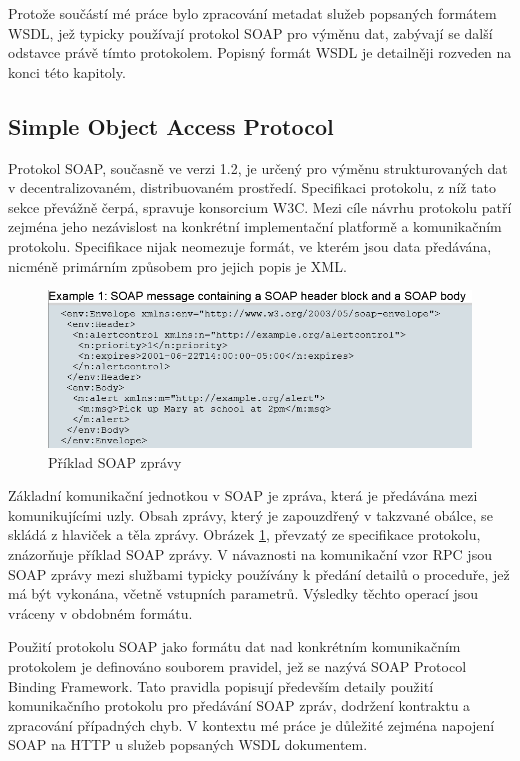 \documentclass[czech,DP]{thesiskiv}
\begin{document}
Protože součástí mé práce bylo zpracování metadat služeb popsaných formátem WSDL, jež typicky používají protokol SOAP pro výměnu dat, zabývají se další odstavce právě tímto protokolem. Popisný formát WSDL je detailněji rozveden na konci této kapitoly.

\subsection{Simple Object Access Protocol} 


Protokol SOAP, současně ve verzi 1.2, je určený pro výměnu strukturovaných dat v decentralizovaném, distribuovaném prostředí. Specifikaci protokolu\cite{soap12}, z níž tato sekce převážně čerpá, spravuje konsorcium W3C. Mezi cíle návrhu protokolu patří zejména jeho nezávislost na konkrétní implementační platformě a komunikačním protokolu\cite{soap12}. Specifikace nijak neomezuje formát, ve kterém jsou data předávána, nicméně primárním způsobem pro jejich popis je XML.

\begin{figure}[h]
	\centering
	\includegraphics[width=\linewidth]{soap-msg-example}
	\caption{Příklad SOAP zprávy}
	\label{fig:soap-msg-example}
\end{figure}

Základní komunikační jednotkou v SOAP je zpráva, která je předávána mezi komunikujícími uzly. Obsah zprávy, který je zapouzdřený v takzvané obálce, se skládá z hlaviček a těla zprávy. Obrázek \ref{fig:soap-msg-example}, převzatý ze specifikace protokolu, znázorňuje příklad SOAP zprávy. V návaznosti na komunikační vzor RPC jsou SOAP zprávy mezi službami typicky používány k předání detailů o proceduře, jež má být vykonána, včetně vstupních parametrů. Výsledky těchto operací jsou vráceny v obdobném formátu.

Použití protokolu SOAP jako formátu dat nad konkrétním komunikačním protokolem je definováno souborem pravidel, jež se nazývá SOAP Protocol Binding Framework. Tato pravidla popisují především detaily použití komunikačního protokolu pro předávání SOAP zpráv, dodržení kontraktu a zpracování případných chyb. V kontextu mé práce je důležité zejména napojení SOAP na HTTP u služeb popsaných WSDL dokumentem.
\end{document}
